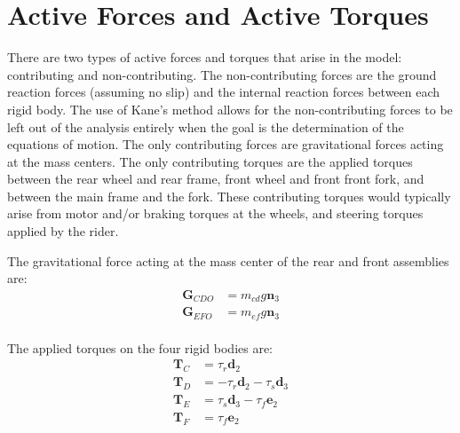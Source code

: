 \documentclass[letterpaper,11pt]{article}
\newcommand{\bs}[1]{ \boldsymbol{ #1 } }
\begin{document}
\section*{Active Forces and Active Torques}
\label{sec:active_forces}
There are two types of active forces and torques that arise in the model:
contributing and non-contributing.  The non-contributing forces are the ground
reaction forces (assuming no slip) and the internal reaction forces between
each rigid body.  The use of Kane's method allows for the non-contributing
forces to be left out of the analysis entirely \cite{Kane1985} when the goal is
the determination of the equations of motion.  The only contributing forces are
gravitational forces acting at the mass centers. The only contributing torques
are the applied torques between the rear wheel and rear frame, front wheel and
front front fork, and between the main frame and the fork.  These contributing
torques would typically arise from motor and/or braking torques at the wheels,
and steering torques applied by the rider.

The gravitational force acting at the mass center of the rear and front
assemblies are:
\begin{align*}
  \bs{G}_{CDO} & = m_{cd} g \bs{n}_3 \\
  \bs{G}_{EFO} & = m_{ef} g \bs{n}_3 \\
\end{align*}

The applied torques on the four rigid bodies are:
\begin{align*}
  \bs{T}_C & = \tau_r \bs{d}_2 \\
  \bs{T}_D & = -\tau_r \bs{d}_2 - \tau_s \bs{d}_3 \\
  \bs{T}_E & = \tau_s \bs{d}_3 - \tau_f \bs{e}_2 \\
  \bs{T}_F & = \tau_f \bs{e}_2
\end{align*}
\end{document}

